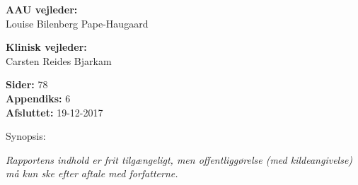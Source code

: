 \begin{minipage}[t]{0.48\textwidth}
\textbf{AAU vejleder:} %
\\\hspace*{2ex}Louise Bilenberg Pape-Haugaard
 \\ \bigskip\hspace{2ex}
 
 
\textbf{Klinisk vejleder:} %
\\\hspace*{2ex}Carsten Reides Bjarkam
 \\ \bigskip\hspace{2ex}

\vspace*{0.5cm}

\textbf{Sider:} 78 \\
\textbf{Appendiks:} 6 \\ 
\textbf{Afsluttet:} 19-12-2017

\end{minipage}
\hfill
\begin{minipage}[t]{1.5\textwidth}%
Synopsis: \\[1pt]
\fbox{\parbox{8.5cm}{}}
\end{minipage}

\vfill

{\footnotesize\itshape Rapportens indhold er frit tilgængeligt, men offentliggørelse (med kildeangivelse) må kun ske efter aftale
med forfatterne.}

